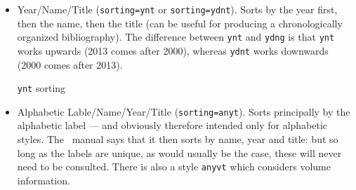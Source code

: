 \begin{itemize}
\begin{marginfigure}[-15ex]
  \vspace{0.5pt}
  \caption{\texttt{nyt} sorting}
  \end{marginfigure}
\item
  Year/Name/Title (\texttt{sorting=ynt} or \texttt{sorting=ydnt}). Sorts
  by the year first, then the name, then the title (can be useful for
  producing a chronologically organized bibliography). The difference
  between \texttt{ynt} and \texttt{ydng} is that \texttt{ynt} works
  upwards (2013 comes after 2000), whereas \texttt{ydnt} works downwards
  (2000 comes after 2013).
  \begin{marginfigure}[1ex]
\vspace{0.5pt}
  \caption{\texttt{ynt} sorting}
  \end{marginfigure}

\item
  Alphabetic Lable/Name/Year/Title (\texttt{sorting=anyt}). Sorts
  principally by the alphabetic label --- and obviously therefore
  intended only for alphabetic styles. The \biblatex~manual says that it
  then sorts by name, year and title: but so long as the labels are
  unique, as would usually be the case, these will never need to be
  consulted. There is also a style \texttt{anyvt} which
  considers volume information.


\end{itemize}

